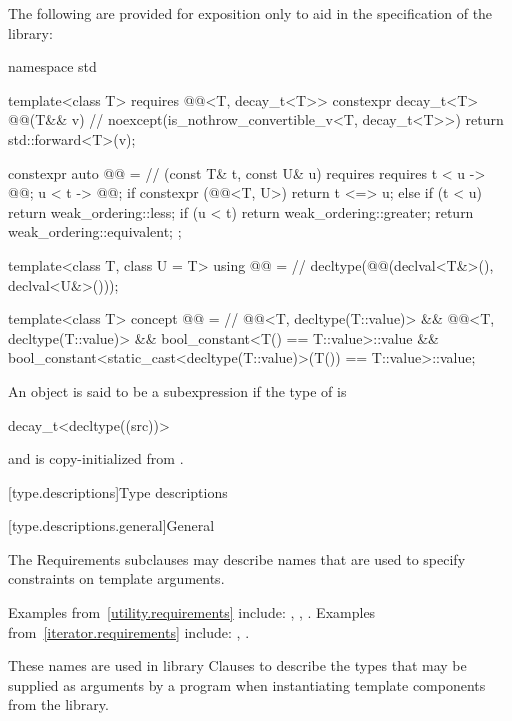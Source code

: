 \pnum
The following are provided for exposition only
to aid in the specification of the library:
%
\begin{codeblock}
namespace std {
  template<class T>
    requires @@<T, decay_t<T>>
      constexpr decay_t<T> @@(T&& v)          // \expos
        noexcept(is_nothrow_convertible_v<T, decay_t<T>>)
      { return std::forward<T>(v); }

  constexpr auto @@ =                    // (const T& t, const U& u)
      requires requires {
        { t < u } -> @@;
        { u < t } -> @@;
      }
    {
      if constexpr (@@<T, U>) {
        return t <=> u;
      } else {
        if (t < u) return weak_ordering::less;
        if (u < t) return weak_ordering::greater;
        return weak_ordering::equivalent;
      }
    };

  template<class T, class U = T>
  using @@ =                      // \expos
    decltype(@@(declval<T&>(), declval<U&>()));

  template<class T>
    concept @@ =                  // \expos
      @@<T, decltype(T::value)> &&
      @@<T, decltype(T::value)> &&
      bool_constant<T() == T::value>::value &&
      bool_constant<static_cast<decltype(T::value)>(T()) == T::value>::value;
}
\end{codeblock}

\pnum
An object  is said to be 
a subexpression 
if the type of  is
\begin{codeblock}
decay_t<decltype((src))>
\end{codeblock} and  is copy-initialized from .

[type.descriptions]{Type descriptions}

[type.descriptions.general]{General}

\pnum
The Requirements subclauses may describe names that are used to specify
constraints on template arguments.
\begin{footnote}
Examples
from~\ref{utility.requirements} include:
,
,
.
Examples from~\ref{iterator.requirements} include:
,
.
\end{footnote}
These names are used in library Clauses
to describe the types that
may be supplied as arguments by a \Cpp{} program when instantiating template components from
the library.

